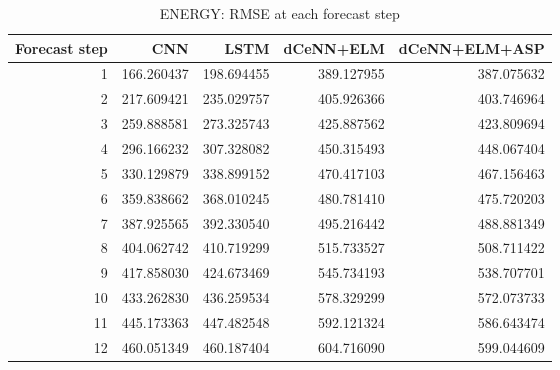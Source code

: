 \begin{table}
\caption{ENERGY: RMSE at each forecast step}
\begin{tabular}{rrrrr}
\toprule
Forecast step & CNN & LSTM & dCeNN+ELM & dCeNN+ELM+ASP \\
\midrule
1 & 166.260437 & 198.694455 & 389.127955 & 387.075632 \\
2 & 217.609421 & 235.029757 & 405.926366 & 403.746964 \\
3 & 259.888581 & 273.325743 & 425.887562 & 423.809694 \\
4 & 296.166232 & 307.328082 & 450.315493 & 448.067404 \\
5 & 330.129879 & 338.899152 & 470.417103 & 467.156463 \\
6 & 359.838662 & 368.010245 & 480.781410 & 475.720203 \\
7 & 387.925565 & 392.330540 & 495.216442 & 488.881349 \\
8 & 404.062742 & 410.719299 & 515.733527 & 508.711422 \\
9 & 417.858030 & 424.673469 & 545.734193 & 538.707701 \\
10 & 433.262830 & 436.259534 & 578.329299 & 572.073733 \\
11 & 445.173363 & 447.482548 & 592.121324 & 586.643474 \\
12 & 460.051349 & 460.187404 & 604.716090 & 599.044609 \\
\bottomrule
\end{tabular}
\end{table}
